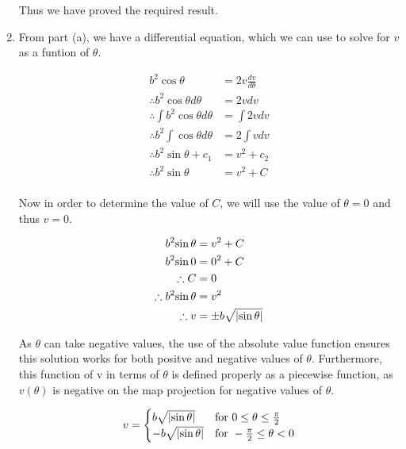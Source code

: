 \documentclass[a4paper]{article}
\begin{document}
\begin{enumerate}[label=(\alph*)]
	Thus we have proved the required result.

	\item From part (a), we have a differential equation, which we can use to solve for $v$ as a funtion of $\theta$.

	\begin{align*}
	b^2{\cos \theta} & = 2v\frac{dv}{d\theta}\\
	\therefore b^2{\cos \theta}{d\theta} & = 2vdv\\
	\therefore \int{b^2{\cos \theta}{d\theta}} & = \int{2vdv}\\
	\therefore b^2\int{{\cos \theta}{d\theta}} & = 2\int{vdv}\\
	\therefore b^2{\sin \theta} + c_1 & = v^2 + c_2\\
	\therefore b^2{\sin \theta} & = v^2 + C\\
	\end{align*}

	Now in order to determine the value of $C$, we will use the value of $\theta = 0$ and thus $v=0$.

	\begin{align*}
	b^2{\sin \theta} & = v^2 + C\\
	b^2{\sin 0} & = 0^2 + C\\
	\therefore C & = 0\\
	\therefore b^2{\sin \theta} & = v^2\\
	\therefore v & = \pm b\sqrt{\abs{\sin \theta}}\\
	\end{align*} 

	As $\theta$ can take negative values, the use of the absolute value function ensures this solution works for both positve and negative values of $\theta$. Furthermore, this function of v in terms of $\theta$ is defined properly as a piecewise function, as $v(\theta)$ is negative on the map projection for negative values of $\theta$.

	\begin{align*}
	v =
	\begin{cases}
	b\sqrt{\abs{\sin \theta}} & \text{for } 0 \leq \theta \leq \frac{\pi}{2}\\ -b\sqrt{\abs{\sin \theta}} & \text{for } -\frac{\pi}{2} \leq \theta < 0\\
	\end{cases}
	\end{align*}


\end{enumerate}
\end{document}

